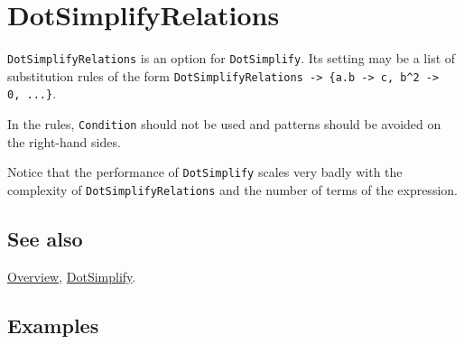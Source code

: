 \documentclass[../FeynCalcManual.tex]{subfiles}
\begin{document}
\hypertarget{dotsimplifyrelations}{
\section{DotSimplifyRelations}\label{dotsimplifyrelations}}

\texttt{DotSimplifyRelations} is an option for \texttt{DotSimplify}. Its
setting may be a list of substitution rules of the form
\texttt{DotSimplifyRelations -> \{\allowbreak{}a.b -> c,\ \allowbreak{}b^2 -> 0,\ \allowbreak{}...\}}.

In the rules, \texttt{Condition} should not be used and patterns should
be avoided on the right-hand sides.

Notice that the performance of \texttt{DotSimplify} scales very badly
with the complexity of \texttt{DotSimplifyRelations} and the number of
terms of the expression.

\subsection{See also}

\hyperlink{toc}{Overview}, \hyperlink{dotsimplify}{DotSimplify}.

\subsection{Examples}
\end{document}
